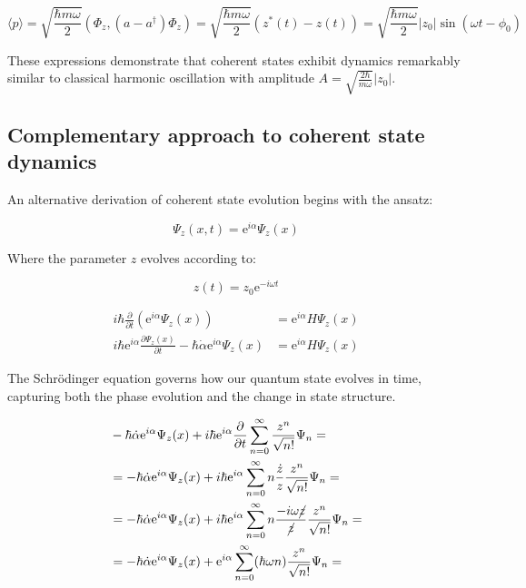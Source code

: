 \documentclass[italian]{HKNdocument}
\begin{document}
\begin{equation}
\langle p\rangle=\sqrt{\frac{\hbar m \omega}{2}}\left(\Phi_{z},\left(a-a^{\dagger}\right) \Phi_{z}\right)=\sqrt{\frac{\hbar m \omega}{2}}\left(z^{*}(t)-z(t)\right)=\sqrt{\frac{\hbar m \omega}{2}}\left|z_{0}\right| \sin \left(\omega t-\phi_{0}\right)
\end{equation}

These expressions demonstrate that coherent states exhibit dynamics remarkably similar to classical harmonic oscillation with amplitude $A=\sqrt{\frac{2 \hbar}{m \omega}}\left|z_{0}\right|$.

\subsection{Complementary approach to coherent state dynamics}
An alternative derivation of coherent state evolution begins with the ansatz:

\begin{equation}
\Psi_{z}(x, t)=\mathrm{e}^{i \alpha} \Psi_{z}(x)
\end{equation}

Where the parameter $z$ evolves according to:

\begin{equation}
z(t)=z_{0} \mathrm{e}^{-i \omega t}
\end{equation}

\begin{align}
i \hbar \frac{\partial}{\partial t}\left(\mathrm{e}^{i \alpha} \Psi_{z}(x)\right) & =\mathrm{e}^{i \alpha} H \Psi_{z}(x) \\
i \hbar \mathrm{e}^{i \alpha} \frac{\partial \Psi_{z}(x)}{\partial t}-\hbar \dot{\alpha} \mathrm{e}^{i \alpha} \Psi_{z}(x) & =\mathrm{e}^{i \alpha} H \Psi_{z}(x)
\end{align}

The Schrödinger equation governs how our quantum state evolves in time, capturing both the phase evolution and the change in state structure.

\begin{align}
& -\hbar \dot{\alpha} \mathrm{e}^{i \alpha} \Psi_{z}(x)+i \hbar \mathrm{e}^{i \alpha} \frac{\partial}{\partial t} \sum_{n=0}^{\infty} \frac{z^{n}}{\sqrt{n!}} \Psi_{n}= \\
& =-\hbar \dot{\alpha} \mathrm{e}^{i \alpha} \Psi_{z}(x)+i \hbar \mathrm{e}^{i \alpha} \sum_{n=0}^{\infty} n \frac{\dot{z}}{z} \frac{z^{n}}{\sqrt{n!}} \Psi_{n}= \\
& =-\hbar \dot{\alpha} \mathrm{e}^{i \alpha} \Psi_{z}(x)+i \hbar \mathrm{e}^{i \alpha} \sum_{n=0}^{\infty} n \frac{-i \omega \cancel{z}}{\cancel{z}} \frac{z^{n}}{\sqrt{n!}} \Psi_{n}=  \\
& =-\hbar \dot{\alpha} \mathrm{e}^{i \alpha} \Psi_{z}(x)+\mathrm{e}^{i \alpha} \sum_{n=0}^{\infty}(\hbar \omega n) \frac{z^{n}}{\sqrt{n!}} \Psi_{n}=
\end{align}
\end{document}
